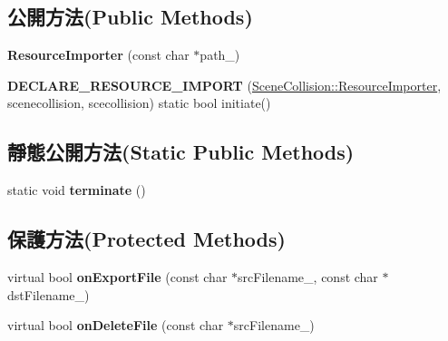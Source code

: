 \subsection*{公開方法(Public Methods)}
\begin{DoxyCompactItemize}
\item 
{\bfseries Resource\+Importer} (const char $\ast$path\+\_\+)\hypertarget{class_magnum_1_1_scene_collision_1_1_resource_importer_a1ef2bedea68aedc8e57f3c9e4b5c9137}{}\label{class_magnum_1_1_scene_collision_1_1_resource_importer_a1ef2bedea68aedc8e57f3c9e4b5c9137}

\item 
{\bfseries D\+E\+C\+L\+A\+R\+E\+\_\+\+R\+E\+S\+O\+U\+R\+C\+E\+\_\+\+I\+M\+P\+O\+RT} (\hyperlink{class_magnum_1_1_scene_collision_1_1_resource_importer}{Scene\+Collision\+::\+Resource\+Importer}, scenecollision, scecollision) static bool initiate()\hypertarget{class_magnum_1_1_scene_collision_1_1_resource_importer_a2c94237834122baa191a2e85d0962ca2}{}\label{class_magnum_1_1_scene_collision_1_1_resource_importer_a2c94237834122baa191a2e85d0962ca2}

\end{DoxyCompactItemize}
\subsection*{靜態公開方法(Static Public Methods)}
\begin{DoxyCompactItemize}
\item 
static void {\bfseries terminate} ()\hypertarget{class_magnum_1_1_scene_collision_1_1_resource_importer_a070699f5526747d95cbb711ca76041cd}{}\label{class_magnum_1_1_scene_collision_1_1_resource_importer_a070699f5526747d95cbb711ca76041cd}

\end{DoxyCompactItemize}
\subsection*{保護方法(Protected Methods)}
\begin{DoxyCompactItemize}
\item 
virtual bool {\bfseries on\+Export\+File} (const char $\ast$src\+Filename\+\_\+, const char $\ast$dst\+Filename\+\_\+)\hypertarget{class_magnum_1_1_scene_collision_1_1_resource_importer_a04e16b14a6090339162eb14456864e47}{}\label{class_magnum_1_1_scene_collision_1_1_resource_importer_a04e16b14a6090339162eb14456864e47}

\item 
virtual bool {\bfseries on\+Delete\+File} (const char $\ast$src\+Filename\+\_\+)\hypertarget{class_magnum_1_1_scene_collision_1_1_resource_importer_ad2a9d2c3dcb04cd8a42a122dab07ac56}{}\label{class_magnum_1_1_scene_collision_1_1_resource_importer_ad2a9d2c3dcb04cd8a42a122dab07ac56}

\end{DoxyCompactItemize}
